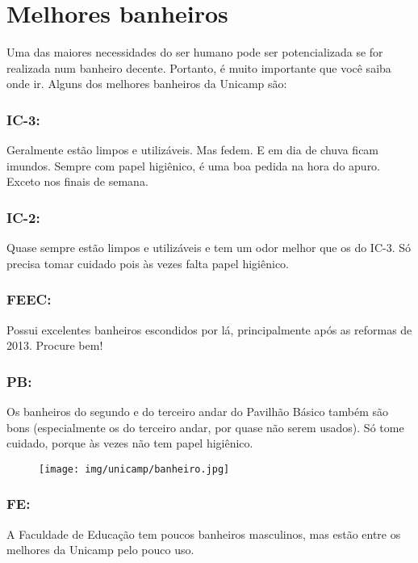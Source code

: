 
\section{Melhores banheiros}

Uma das maiores necessidades do ser humano pode ser potencializada se for
realizada num banheiro decente. Portanto, é muito importante que você saiba onde
ir. Alguns dos melhores banheiros da Unicamp são:

\subsubsection{IC-3:} Geralmente estão limpos e utilizáveis. Mas fedem. E em dia
de chuva ficam imundos. Sempre com papel higiênico, é uma boa pedida na hora do
apuro. Exceto nos finais de semana.

\subsubsection{IC-2:} Quase sempre estão limpos e utilizáveis e tem um odor
melhor que os do IC-3. Só precisa tomar cuidado pois às vezes falta papel
higiênico.

\subsubsection{FEEC:} Possui excelentes banheiros escondidos por lá,
principalmente após as reformas de 2013. Procure bem!

\subsubsection{PB:} Os banheiros do segundo e do terceiro andar do Pavilhão
Básico também são bons (especialmente os do terceiro andar, por quase não serem
usados). Só tome cuidado, porque às vezes não tem papel higiênico.

\begin{figure}[h!]  \centering
  \texttt{[image: img/unicamp/banheiro.jpg]}
\end{figure}

\subsubsection{FE:} A Faculdade de Educação tem poucos banheiros masculinos, mas
estão entre os melhores da Unicamp pelo pouco uso.

